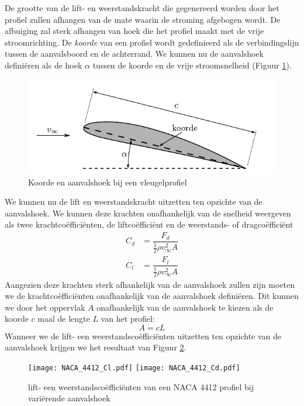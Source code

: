 De grootte van de lift- en weerstandskracht die gegenereerd worden door het profiel zullen afhangen van de mate waarin de stroming afgebogen wordt. De afbuiging zal sterk afhangen van hoek die het profiel maakt met de vrije stroomrichting.
De \emph{koorde} van een profiel wordt gedefinieerd als de verbindingslijn tussen de aanvalsboord en de achterrand. We kunnen nu de aanvalshoek definiëren als de hoek $\alpha$ tussen de koorde en de vrije stroomsnelheid (Figuur \ref{fig:vleugelprofiel aanvalshoek}).
\begin{figure}[htb]
	\centering
	\includegraphics{fig/uitwendige_stroming/vleugelprofiel_aanvalshoek}
	\caption{Koorde en aanvalshoek bij een vleugelprofiel}
	\label{fig:vleugelprofiel aanvalshoek}
\end{figure}
We kunnen nu de lift en weerstandskracht uitzetten ten opzichte van de aanvalshoek. We kunnen deze krachten onafhankelijk van de snelheid weergeven als twee krachtcoëfficiënten, de liftcoëfficiënt en de weerstands- of dragcoëfficiënt
\begin{align}
	C_d &= \dfrac{F_d}{\frac{1}{2}\rho v_{\infty}^2 A} \\
	C_l &= \dfrac{F_l}{\frac{1}{2}\rho v_{\infty}^2 A}
\end{align}
Aangezien deze krachten sterk afhankelijk van de aanvalshoek zullen zijn moeten we de krachtcoëfficiënten onafhankelijk van de aanvalshoek definiëren. Dit kunnen we door het oppervlak $A$ onafhankelijk van de aanvalshoek te kiezen als de koorde $c$ maal de lengte $L$ van het profiel:
\begin{equation}
	A = c L
\end{equation}
Wanneer we de lift- een weerstandscoëfficiënten uitzetten ten opzichte van de aanvalshoek krijgen we het resultaat van Figuur \ref{fig:lift en weerstand ifv aanvalshoek}.
\begin{figure}[htb]
	\centering
	\texttt{[image: NACA\_4412\_Cl.pdf]}
	\texttt{[image: NACA\_4412\_Cd.pdf]}
	\caption{lift- een weerstandscoëfficiënten van een NACA 4412 profiel bij variërende aanvalshoek}
	\label{fig:lift en weerstand ifv aanvalshoek}
\end{figure}

